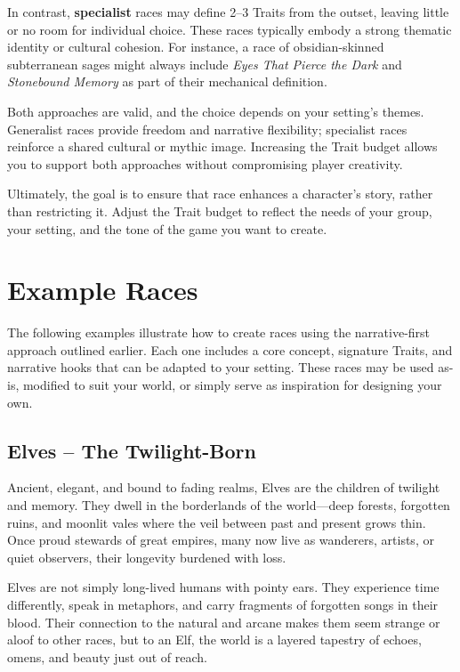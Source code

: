In contrast, \textbf{specialist} races may define 2–3 Traits from the outset, leaving little or no room for individual choice. These races typically embody a strong thematic identity or cultural cohesion. For instance, a race of obsidian-skinned subterranean sages might always include \emph{Eyes That Pierce the Dark} and \emph{Stonebound Memory} as part of their mechanical definition.

Both approaches are valid, and the choice depends on your setting's themes. Generalist races provide freedom and narrative flexibility; specialist races reinforce a shared cultural or mythic image. Increasing the Trait budget allows you to support both approaches without compromising player creativity.

Ultimately, the goal is to ensure that race enhances a character's story, rather than restricting it. Adjust the Trait budget to reflect the needs of your group, your setting, and the tone of the game you want to create.



\section{Example Races}

The following examples illustrate how to create races using the narrative-first approach outlined earlier. Each one includes a core concept, signature Traits, and narrative hooks that can be adapted to your setting. These races may be used as-is, modified to suit your world, or simply serve as inspiration for designing your own.

\subsection*{Elves – The Twilight-Born}

Ancient, elegant, and bound to fading realms, Elves are the children of twilight and memory. They dwell in the borderlands of the world—deep forests, forgotten ruins, and moonlit vales where the veil between past and present grows thin. Once proud stewards of great empires, many now live as wanderers, artists, or quiet observers, their longevity burdened with loss.

Elves are not simply long-lived humans with pointy ears. They experience time differently, speak in metaphors, and carry fragments of forgotten songs in their blood. Their connection to the natural and arcane makes them seem strange or aloof to other races, but to an Elf, the world is a layered tapestry of echoes, omens, and beauty just out of reach.


